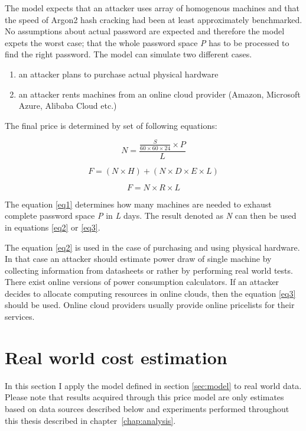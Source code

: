 \documentclass[nolof]{fithesis3}
\begin{document}
The model expects that an attacker uses array of homogenous machines and that the speed of Argon2 hash cracking had been at least approximately benchmarked. No assumptions about actual password are expected and therefore the model expets the worst case; that the whole password space \emph{P} has to be processed to find the right password. The model can simulate two different cases.

\begin{enumerate}
\item an attacker plans to purchase actual physical hardware

\item an attacker rents machines from an online cloud provider (Amazon, Microsoft Azure, Alibaba Cloud etc.)
\end{enumerate}

The final price is determined by set of following equations:

\begin{equation}
\label{eq1}
N = \frac{\frac{S}{60 \times 60 \times 24} \times P}{L}
\end{equation}

\begin{equation}
\label{eq2}
F = ( N \times H ) + ( N \times D \times E \times L)
\end{equation}

\begin{equation}
\label{eq3}
F = N \times R \times L
\end{equation}

The equation \ref{eq1} determines how many machines are needed to exhaust complete password space \emph{P} in \emph{L} days. The result denoted as \emph{N} can then be used in equations \ref{eq2} or \ref{eq3}.

The equation \ref{eq2} is used in the case of purchasing and using physical hardware. In that case an attacker should estimate power draw of single machine by collecting information from datasheets or rather by performing real world tests. There exist online versions of power consumption calculators. If an attacker decides to allocate computing resources in online clouds, then the equation \ref{eq3} should be used. Online cloud providers usually provide online pricelists for their services.


\section{Real world cost estimation}
In this section I apply the model defined in section \ref{sec:model} to real world data. Please note that results acquired through this price model are only estimates based on data sources described below and experiments performed throughout this thesis described in chapter~\ref{chap:analysis}.
\end{document}
